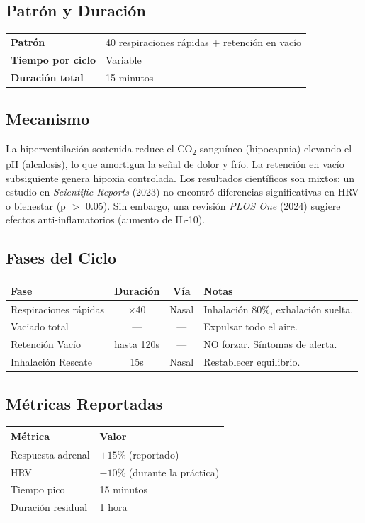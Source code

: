 \documentclass[12pt,a4paper]{article}
\begin{document}
\subsection*{Patrón y Duración}
\begin{tabularx}{\textwidth}{lX}
    \textbf{Patrón} & 40 respiraciones rápidas + retención en vacío \\
    \textbf{Tiempo por ciclo} & Variable \\
    \textbf{Duración total} & 15 minutos \\
\end{tabularx}

\subsection*{Mecanismo}
La hiperventilación sostenida reduce el CO\textsubscript{2} sanguíneo (hipocapnia)
elevando el pH (alcalosis), lo que amortigua la señal de dolor y frío. La
retención en vacío subsiguiente genera hipoxia controlada. Los resultados
científicos son mixtos: un estudio en \textit{Scientific Reports} (2023) no
encontró diferencias significativas en HRV o bienestar (p $>$ 0.05).
Sin embargo, una revisión \textit{PLOS One} (2024) sugiere efectos
anti-inflamatorios (aumento de IL-10).

\subsection*{Fases del Ciclo}
\begin{tabularx}{\textwidth}{lccX}
    \toprule
    \textbf{Fase} & \textbf{Duración} & \textbf{Vía} & \textbf{Notas} \\
    \midrule
    Respiraciones rápidas & $\times$40 & Nasal & Inhalación 80\%, exhalación suelta. \\
    Vaciado total & — & — & Expulsar todo el aire. \\
    Retención Vacío & hasta 120s & — & NO forzar. Síntomas de alerta. \\
    Inhalación Rescate & 15s & Nasal & Restablecer equilibrio. \\
    \bottomrule
\end{tabularx}

\subsection*{Métricas Reportadas}
\begin{tabularx}{\textwidth}{lX}
    \toprule
    \textbf{Métrica} & \textbf{Valor} \\
    \midrule
    Respuesta adrenal & $+15\%$ (reportado) \\
    HRV & $-10\%$ (durante la práctica) \\
    Tiempo pico & 15 minutos \\
    Duración residual & 1 hora \\
    \bottomrule
\end{tabularx}
\end{document}
